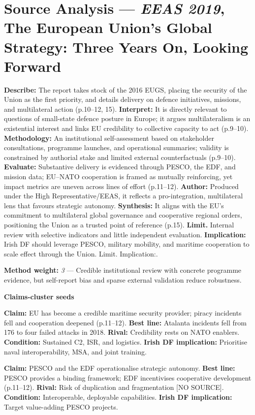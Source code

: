 \section*{Source Analysis — \textit{EEAS 2019}, The European Union’s Global Strategy: Three Years On, Looking Forward}
\textbf{Describe:} The report takes stock of the 2016 EUGS, placing the security of the Union as the first priority, and details delivery on defence initiatives, missions, and multilateral action (p.10–12, 15).
\textbf{Interpret:} It is directly relevant to questions of small-state defence posture in Europe; it argues multilateralism is an existential interest and links EU credibility to collective capacity to act (p.9–10).
\textbf{Methodology:} An institutional self-assessment based on stakeholder consultations, programme launches, and operational summaries; validity is constrained by authorial stake and limited external counterfactuals (p.9–10).
\textbf{Evaluate:} Substantive delivery is evidenced through PESCO, the EDF, and mission data; EU–NATO cooperation is framed as mutually reinforcing, yet impact metrics are uneven across lines of effort (p.11–12).
\textbf{Author:} Produced under the High Representative/EEAS, it reflects a pro-integration, multilateral lens that favours strategic autonomy.
\textbf{Synthesis:} It aligns with the EU’s commitment to multilateral global governance and cooperative regional orders, positioning the Union as a trusted point of reference (p.15).
\textbf{Limit.} Internal review with selective indicators and little independent evaluation.
\textbf{Implication:} Irish DF should leverage PESCO, military mobility, and maritime cooperation to scale effect through the Union. Limit. Implication:.

\textbf{Method weight:} \textit{3} — Credible institutional review with concrete programme evidence, but self-report bias and sparse external validation reduce robustness.

\textbf{Claims-cluster seeds}

\textbf{Claim:} EU has become a credible maritime security provider; piracy incidents fell and cooperation deepened (p.11–12). \textbf{Best line:} Atalanta incidents fell from 176 to four failed attacks in 2018. \textbf{Rival:} Credibility rests on NATO enablers. \textbf{Condition:} Sustained C2, ISR, and logistics. \textbf{Irish DF implication:} Prioritise naval interoperability, MSA, and joint training.

\textbf{Claim:} PESCO and the EDF operationalise strategic autonomy. \textbf{Best line:} PESCO provides a binding framework; EDF incentivises cooperative development (p.11–12). \textbf{Rival:} Risk of duplication and fragmentation [NO SOURCE]. \textbf{Condition:} Interoperable, deployable capabilities. \textbf{Irish DF implication:} Target value-adding PESCO projects.

